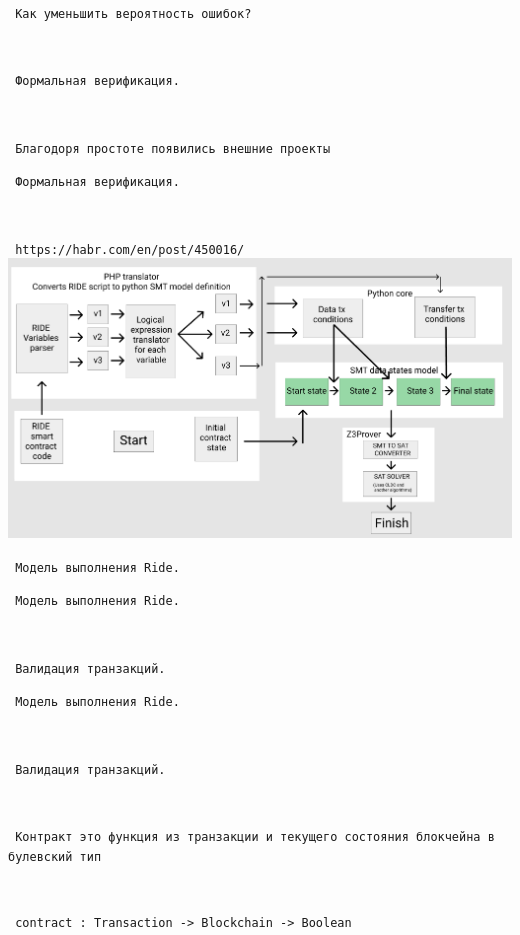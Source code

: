 \documentclass[11pt,handout,pdf,hyperref={unicode}]{beamer}
\begin{document}
\begin{frame}[fragile]

\texttt{ Как уменьшить вероятность ошибок? }

\texttt{ }

\texttt{ Формальная верификация. }

\texttt{ }

\texttt{ Благодоря простоте появились внешние проекты }

\end{frame}

\begin{frame}[fragile]

\texttt{ Формальная верификация. }

\texttt{ }

\texttt{ https://habr.com/en/post/450016/ }
\includegraphics[scale=0.25]{ride_z3.png}

\end{frame}

\begin{frame}[fragile]

\texttt{ Модель выполнения Ride. }

\end{frame}

\begin{frame}[fragile]

\texttt{ Модель выполнения Ride. }

\texttt{ }

\texttt{ Валидация транзакций. }

\end{frame}

\begin{frame}[fragile]

\texttt{ Модель выполнения Ride. }

\texttt{ }

\texttt{ Валидация транзакций. }

\texttt{ }

\texttt{ Контракт это функция из транзакции и текущего состояния блокчейна в булевский тип }

\texttt{ }

\begin{verbatim}
 contract : Transaction -> Blockchain -> Boolean
\end{verbatim}

\end{frame}
\end{document}
